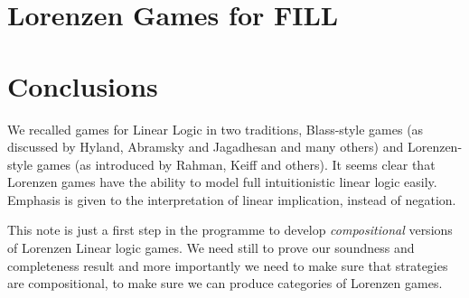 \documentclass{article}
\begin{document}
\section*{Lorenzen Games for FILL}
\label{sec:lorenzen_games_for_fill}


 \section*{Conclusions}
 We recalled games for Linear Logic in two traditions, Blass-style
 games (as discussed by Hyland, Abramsky and Jagadhesan and many
 others) and Lorenzen-style games (as introduced by Rahman, Keiff and
 others). It seems clear that Lorenzen games have the ability to model
 full intuitionistic linear logic easily. Emphasis is given to the
 interpretation of linear implication, instead of negation.
 
 This note is just a first step in the programme to develop {\em
   compositional} versions of Lorenzen Linear logic games. We need
 still to prove our soundness and completeness result and more
 importantly we need to make sure that strategies are compositional,
 to make sure we can produce categories of Lorenzen games.











\end{document}

